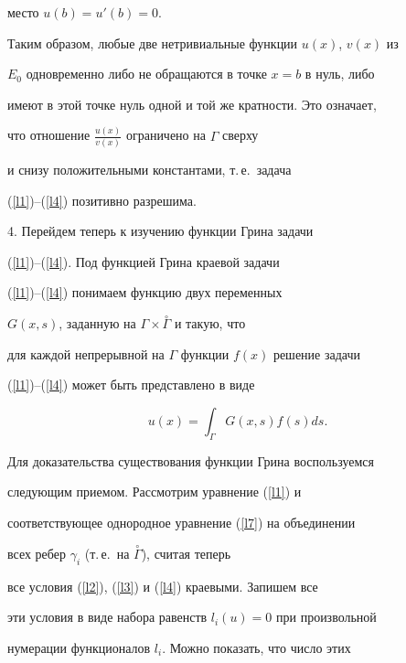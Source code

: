 {{{{{{{место $u(b)=u'(b)=0$.





Таким образом, любые две нетривиальные функции $u(x)$, $v(x)$ из


$E_0$ одновременно либо не обращаются в точке $x=b$ в нуль, либо


имеют в этой точке нуль одной и той же кратности. Это означает,


что отношение $\frac{u(x)}{v(x)}$ ограничено на $\Gamma$ сверху


и снизу положительными константами, т.\,е.~задача


(\ref{l1})--(\ref{l4}) позитивно разрешима.


\medskip





4. Перейдем теперь к изучению функции Грина задачи


(\ref{l1})--(\ref{l4}). Под функцией Грина краевой задачи


(\ref{l1})--(\ref{l4}) понимаем функцию двух переменных


$G(x,s)$, заданную на $\Gamma\times\overset{\circ}{\Gamma}$ и такую, что


для каждой непрерывной на $\Gamma$ функции $f(x)$ решение задачи


(\ref{l1})--(\ref{l4}) может быть представлено в виде


\begin{equation}


\label{l9}


u(x)=\int_{\Gamma}G(x,s)f(s)ds.


\end{equation}





Для доказательства существования функции Грина воспользуемся


следующим приемом. Рассмотрим уравнение (\ref{l1}) и


соответствующее однородное уравнение (\ref{l7}) на объединении


всех ребер $\gamma_i$ (т.\,е.~на $\overset{\circ}{\Gamma}$), считая теперь


все условия (\ref{l2}), (\ref{l3}) и (\ref{l4}) краевыми. Запишем все


эти условия в виде набора равенств $l_i(u)=0 $ при произвольной


нумерации функционалов $l_i$. Можно показать, что число этих


}}}}}}}
